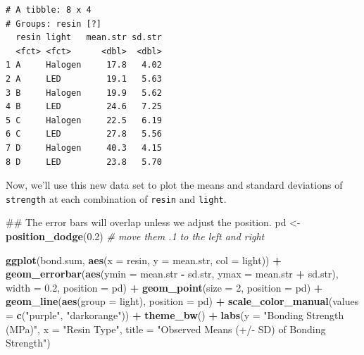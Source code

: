 \documentclass[]{book}
\newenvironment{Shaded}{\begin{snugshade}}{\end{snugshade}}
\newcommand{\KeywordTok}[1]{\textcolor[rgb]{0.13,0.29,0.53}{\textbf{#1}}}
\newcommand{\DataTypeTok}[1]{\textcolor[rgb]{0.13,0.29,0.53}{#1}}
\newcommand{\DecValTok}[1]{\textcolor[rgb]{0.00,0.00,0.81}{#1}}
\newcommand{\FloatTok}[1]{\textcolor[rgb]{0.00,0.00,0.81}{#1}}
\newcommand{\StringTok}[1]{\textcolor[rgb]{0.31,0.60,0.02}{#1}}
\newcommand{\CommentTok}[1]{\textcolor[rgb]{0.56,0.35,0.01}{\textit{#1}}}
\newcommand{\OperatorTok}[1]{\textcolor[rgb]{0.81,0.36,0.00}{\textbf{#1}}}
\newcommand{\NormalTok}[1]{#1}
\theoremstyle{definition}
\theoremstyle{definition}
\theoremstyle{definition}
\theoremstyle{remark}
\begin{document}
\begin{verbatim}
# A tibble: 8 x 4
# Groups: resin [?]
  resin light   mean.str sd.str
  <fct> <fct>      <dbl>  <dbl>
1 A     Halogen     17.8   4.02
2 A     LED         19.1   5.63
3 B     Halogen     19.9   5.62
4 B     LED         24.6   7.25
5 C     Halogen     22.5   6.19
6 C     LED         27.8   5.56
7 D     Halogen     40.3   4.15
8 D     LED         23.8   5.70
\end{verbatim}

Now, we'll use this new data set to plot the means and standard
deviations of \texttt{strength} at each combination of \texttt{resin}
and \texttt{light}.

\begin{Shaded}
\begin{Highlighting}[]
\NormalTok{## The error bars will overlap unless we adjust the position.}
\NormalTok{pd <-}\StringTok{ }\KeywordTok{position_dodge}\NormalTok{(}\FloatTok{0.2}\NormalTok{) }\CommentTok{# move them .1 to the left and right}

\KeywordTok{ggplot}\NormalTok{(bond.sum, }\KeywordTok{aes}\NormalTok{(}\DataTypeTok{x =}\NormalTok{ resin, }\DataTypeTok{y =}\NormalTok{ mean.str, }\DataTypeTok{col =}\NormalTok{ light)) }\OperatorTok{+}
\StringTok{    }\KeywordTok{geom_errorbar}\NormalTok{(}\KeywordTok{aes}\NormalTok{(}\DataTypeTok{ymin =}\NormalTok{ mean.str }\OperatorTok{-}\StringTok{ }\NormalTok{sd.str, }
                      \DataTypeTok{ymax =}\NormalTok{ mean.str }\OperatorTok{+}\StringTok{ }\NormalTok{sd.str),}
                  \DataTypeTok{width =} \FloatTok{0.2}\NormalTok{, }\DataTypeTok{position =}\NormalTok{ pd) }\OperatorTok{+}
\StringTok{    }\KeywordTok{geom_point}\NormalTok{(}\DataTypeTok{size =} \DecValTok{2}\NormalTok{, }\DataTypeTok{position =}\NormalTok{ pd) }\OperatorTok{+}\StringTok{ }
\StringTok{    }\KeywordTok{geom_line}\NormalTok{(}\KeywordTok{aes}\NormalTok{(}\DataTypeTok{group =}\NormalTok{ light), }\DataTypeTok{position =}\NormalTok{ pd) }\OperatorTok{+}
\StringTok{    }\KeywordTok{scale_color_manual}\NormalTok{(}\DataTypeTok{values =} \KeywordTok{c}\NormalTok{(}\StringTok{"purple"}\NormalTok{, }\StringTok{"darkorange"}\NormalTok{)) }\OperatorTok{+}
\StringTok{    }\KeywordTok{theme_bw}\NormalTok{() }\OperatorTok{+}
\StringTok{    }\KeywordTok{labs}\NormalTok{(}\DataTypeTok{y =} \StringTok{"Bonding Strength (MPa)"}\NormalTok{, }\DataTypeTok{x =} \StringTok{"Resin Type"}\NormalTok{,}
         \DataTypeTok{title =} \StringTok{"Observed Means (+/- SD) of Bonding Strength"}\NormalTok{)}
\end{Highlighting}
\end{Shaded}
\end{document}
